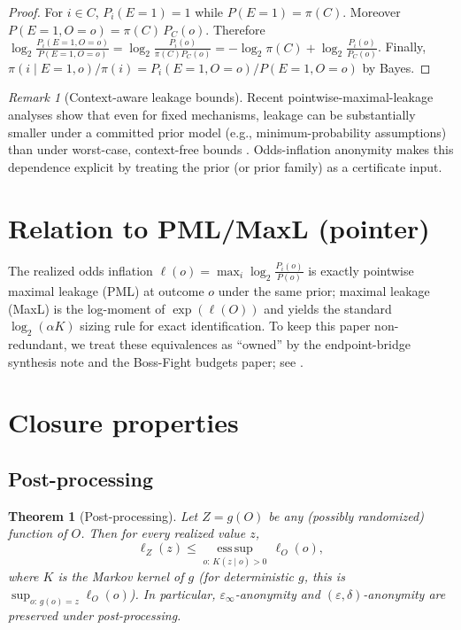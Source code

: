 \documentclass[11pt]{article}
\newtheorem{theorem}{Theorem}
\theoremstyle{definition}
\theoremstyle{remark}
\newtheorem{remark}{Remark}
\begin{document}
\begin{proof}
For $i\in C$, $P_i(E{=}1)=1$ while $P(E{=}1)=\pi(C)$.
Moreover $P(E{=}1,O=o)=\pi(C)\,P_C(o)$.
Therefore
$\log_2\tfrac{P_i(E{=}1,O=o)}{P(E{=}1,O=o)}=\log_2\tfrac{P_i(o)}{\pi(C)P_C(o)}=-\log_2\pi(C)+\log_2\tfrac{P_i(o)}{P_C(o)}$.
Finally, $\pi(i\mid E{=}1,o)/\pi(i)=P_i(E{=}1,O=o)/P(E{=}1,O=o)$ by Bayes.
\end{proof}

\begin{remark}[Context-aware leakage bounds]
Recent pointwise-maximal-leakage analyses show that even for fixed mechanisms, leakage can be substantially smaller under a committed prior model (e.g., minimum-probability assumptions) than under worst-case, context-free bounds \cite{ZhaoSaeidianOechtering2026ContextAware}.
Odds-inflation anonymity makes this dependence explicit by treating the prior (or prior family) as a certificate input.
\end{remark}

\section{Relation to PML/MaxL (pointer)}
The realized odds inflation $\ell(o)=\max_i\log_2\tfrac{P_i(o)}{P(o)}$ is exactly pointwise maximal leakage (PML) at outcome $o$ under the same prior; maximal leakage (MaxL) is the log-moment of $\exp(\ell(O))$ and yields the standard $\log_2(\alpha K)$ sizing rule for exact identification.
To keep this paper non-redundant, we treat these equivalences as ``owned'' by the endpoint-bridge synthesis note and the Boss-Fight budgets paper; see \cite{series:endpointbridge,series:bossfightA}.

\section{Closure properties}
\subsection{Post-processing}
\begin{theorem}[Post-processing]\label{thm:postprocessing}
Let $Z=g(O)$ be any (possibly randomized) function of $O$.
Then for every realized value $z$,
\[
\ell_Z(z)\le \operatorname*{ess\,sup}_{o:\,K(z\mid o)>0}\,\ell_O(o),
\]
where $K$ is the Markov kernel of $g$ (for deterministic $g$, this is $\sup_{o:\,g(o)=z}\ell_O(o)$).
In particular, $\varepsilon_\infty$-anonymity and $(\varepsilon,\delta)$-anonymity are preserved under post-processing.
\end{theorem}
\end{document}
